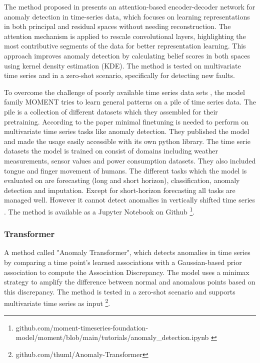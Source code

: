 %
The method proposed in \cite{wang_attention-based_2022} presents an attention-based encoder-decoder network for anomaly detection in time-series data, which focuses on learning representations in both principal and residual spaces without needing reconstruction. The attention mechanism is applied to rescale convolutional layers, highlighting the most contributive segments of the data for better representation learning. This approach improves anomaly detection by calculating belief scores in both spaces using kernel density estimation (KDE). The method is tested on multivariate time series and in a zero-shot scenario, specifically for detecting new faults.

To overcome the challenge of poorly available time series data sets \cite{ma_survey_2023}, the model family MOMENT tries to learn general patterns on a pile of time series data. The pile is a collection of different datasets which they assembled for their pretraining. According to the paper minimal finetuning is needed to perform on multivariate time series tasks like anomaly detection. They published the model and made the usage easily accessible with its own python library. The time serie datasets the model is trained on consist of domains including weather measurements, sensor values and power consumption datasets. They also included tongue and finger movement of humans. The different tasks which the model is evaluated on are forecasting (long and short horizon), classification, anomaly detection and imputation. Except for short-horizon forecasting all tasks are managed well. However it cannot detect anomalies in vertically shifted time series \cite{goswami_moment_2024}. The method is available as a Jupyter Notebook on Github \footnote{\fussy\tiny github.com/moment-timeseries-foundation-model/moment/blob/main/tutorials/anomaly\_detection.ipynb \label{foot_moment}}.


\subsubsection{Transformer}

A method called "Anomaly Transformer", which detects anomalies in time series by comparing a time point’s learned associations with a Gaussian-based prior association to compute the Association Discrepancy. The model uses a minimax strategy to amplify the difference between normal and anomalous points based on this discrepancy. The method is tested in a zero-shot scenario and supports multivariate time series as input \cite{xu_anomaly_2022} \footnote{\fussy\tiny github.com/thuml/Anomaly-Transformer}.

